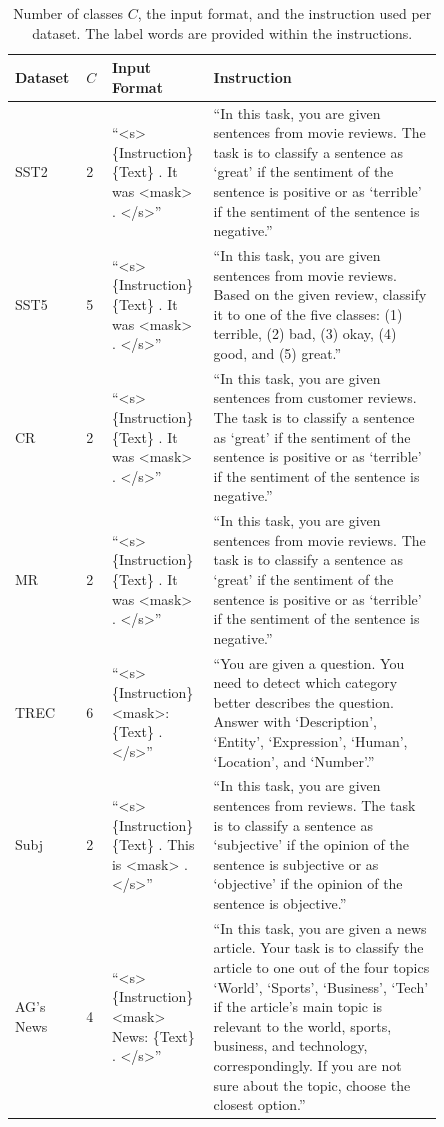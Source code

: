 \documentclass[11pt]{article}
\begin{document}
\begin{table}
\centering
\caption{Number of classes $C$, the input format, and the instruction used per dataset. The label words are provided within the instructions.}
\begin{tabular}{ p{0.1\linewidth} | p{0.05\linewidth} | p{0.2\linewidth} | p{0.5\linewidth} }
\hline
Dataset & $C$ & Input Format & Instruction \\
\hline
SST2 & 2 & ``<s> \{Instruction\} \{Text\} . It was <mask> . </s>'' & ``In this task, you are given sentences from movie reviews. The task is to classify a sentence as `great' if
the sentiment of the sentence is positive or as `terrible' if the sentiment of the sentence is negative.''\\
\hline
SST5 & 5 & ``<s> \{Instruction\} \{Text\} . It was <mask> . </s>'' & ``In this task, you are given sentences from movie reviews. Based on the given review, classify it to one of
the five classes: (1) terrible, (2) bad, (3) okay, (4) good, and (5) great.''\\
\hline
CR & 2 & ``<s> \{Instruction\} \{Text\} . It was <mask> . </s>'' & ``In this task, you are given sentences from customer reviews. The task is to classify a sentence as `great' if
the sentiment of the sentence is positive or as `terrible' if the sentiment of the sentence is negative.''\\
\hline
MR & 2 & ``<s> \{Instruction\} \{Text\} . It was <mask> . </s>'' & ``In this task, you are given sentences from movie reviews. The task is to classify a sentence as `great' if
the sentiment of the sentence is positive or as `terrible' if the sentiment of the sentence is negative.''\\
\hline
TREC & 6 & ``<s> \{Instruction\} <mask>: \{Text\} . </s>'' & ``You are given a question. You need to detect which category better describes the question. Answer with `Description', `Entity', `Expression', `Human', `Location', and `Number'.'' \\
\hline
Subj & 2 & ``<s> \{Instruction\} \{Text\} . This is <mask> . </s>'' & ``In this task, you are given sentences from reviews. The task is to classify a sentence as `subjective' if the
opinion of the sentence is subjective or as `objective' if the opinion of the sentence is objective.''\\
\hline
AG's News & 4 & ``<s> \{Instruction\} <mask> News: \{Text\} . </s>'' & ``In this task, you are given a news article. Your task is to classify the article to one out of the four topics
`World', `Sports', `Business', `Tech' if the article's main topic is relevant to the world, sports, business,
and technology, correspondingly. If you are not sure about the topic, choose the closest option.''\\
\hline
\end{tabular}
\label{task-input-format}
\end{table}
\end{document}
